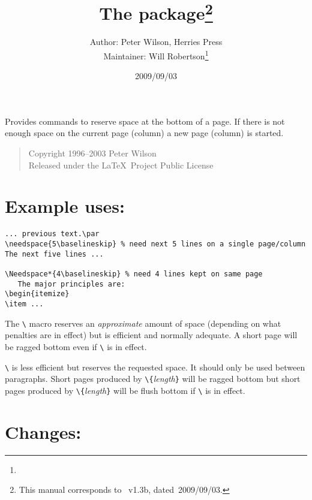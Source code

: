 \documentclass[pagesize=auto, fontsize=12pt, DIV=11]{scrartcl}
\title{The \pkg{needspace} package\thanks{This manual corresponds to \pkg{needspace}~v1.3b, dated~2009/09/03.}}
\author{Author: Peter Wilson, Herries Press\\Maintainer: Will Robertson\thanks{\mail{will.robertson@latex-project.org}}}
\date{2009/09/03}
\makeatletter
\newcommand*{\cs}[1]{\texttt{\textbackslash#1}}
\newcommand*{\cmd}[1]{\cs{\expandafter\@gobble\string#1}}
\newcommand*{\meta}[1]{\textlangle\textsl{#1}\textrangle}
\newcommand*{\marg}[1]{\texttt{\{}\meta{#1}\texttt{\}}}
\makeatother
\begin{document}
\maketitle

\noindent
Provides commands to reserve space at the bottom of a page. If there
is not enough space on the current page (column) a new page (column)
is started.

\begin{quote}
  \small
  Copyright 1996--2003 Peter Wilson\\
  Released under the \LaTeX\ Project Public License
\end{quote}


\section{Example uses:}

\begin{verbatim}
... previous text.\par
\needspace{5\baselineskip} % need next 5 lines on a single page/column
The next five lines ...

\Needspace*{4\baselineskip} % need 4 lines kept on same page
   The major principles are:
\begin{itemize}
\item ...
\end{verbatim}

The \cmd{\needspace} macro reserves an \emph{approximate} amount of space (depending
on what penalties are in effect) but is efficient and normally adequate.
A short page will be ragged bottom even if \cmd{\flushbottom} is in
effect.

\cmd{\Needspace} is less efficient but reserves the requested space. It
should only be used between paragraphs. Short pages produced by 
\cmd{\Needspace}\marg{length} will be ragged bottom but short pages produced by 
\cmd{\Needspace*}\marg{length} will be flush bottom if \cmd{\flushbottom} is in effect.


\section{Changes:}
\end{document}
